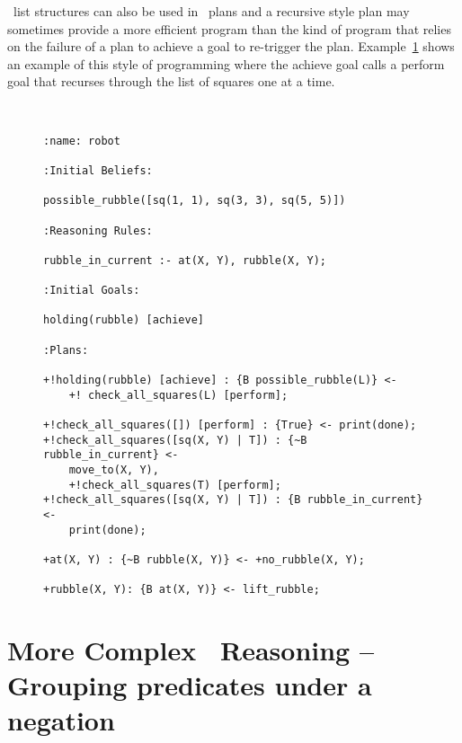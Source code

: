 \prolog\ list structures can also be used in \gwendolen\ plans and a recursive style plan may sometimes provide a more efficient program than the kind of program that relies on the failure of a plan to achieve a goal to re-trigger the plan.  Example~\ref{code:pickuprubble_list2} shows an example of this style of programming where the achieve goal calls a perform goal that recurses through the list of squares one at a time.
\begin{figure}[htb]
\begin{ourexample}
\label{code:pickuprubble_list2} \quad \\
\begin{lstlisting}[basicstyle=\sffamily,style=easslisting,language=Gwendolen]
:name: robot

:Initial Beliefs:

possible_rubble([sq(1, 1), sq(3, 3), sq(5, 5)])

:Reasoning Rules:

rubble_in_current :- at(X, Y), rubble(X, Y);

:Initial Goals:

holding(rubble) [achieve]

:Plans:

+!holding(rubble) [achieve] : {B possible_rubble(L)} <- 
    +! check_all_squares(L) [perform];

+!check_all_squares([]) [perform] : {True} <- print(done);
+!check_all_squares([sq(X, Y) | T]) : {~B rubble_in_current} <- 
    move_to(X, Y), 
    +!check_all_squares(T) [perform];
+!check_all_squares([sq(X, Y) | T]) : {B rubble_in_current} <- 
    print(done);

+at(X, Y) : {~B rubble(X, Y)} <- +no_rubble(X, Y);

+rubble(X, Y): {B at(X, Y)} <- lift_rubble;
\end{lstlisting}
\end{ourexample}
\end{figure}

\section{More Complex \prolog\ Reasoning -- Grouping predicates under a negation}

